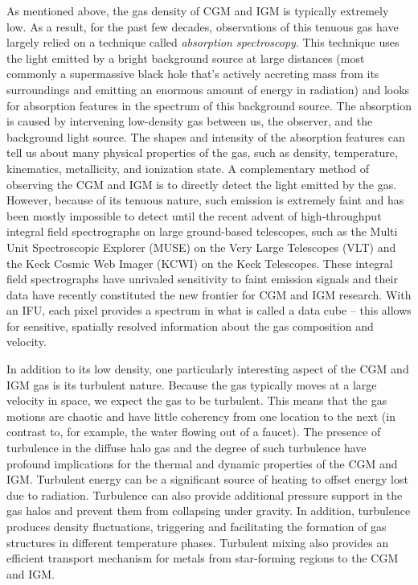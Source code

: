 As mentioned above, the gas density of CGM and IGM is typically extremely low.  As a result, for the past few decades, observations of this tenuous gas have largely relied on a technique called {\it absorption spectroscopy}. This technique uses the light emitted by a bright background source at large distances (most commonly a supermassive black hole that's actively accreting mass from its surroundings and emitting an enormous amount of energy in radiation) and looks for absorption features in the spectrum of this background source.  The absorption is caused by intervening low-density gas between us, the observer, and the background light source. The shapes and intensity of the absorption features can tell us about many physical properties of the gas, such as density, temperature, kinematics, metallicity, and ionization state. A complementary method of observing the CGM and IGM is to directly detect the light emitted by the gas. However, because of its tenuous nature, such emission is extremely faint and has been mostly impossible to detect until the recent advent of high-throughput integral field spectrographs on large ground-based telescopes, such as the Multi Unit Spectroscopic Explorer (MUSE) on the Very Large Telescopes (VLT) and the Keck Cosmic Web Imager  (KCWI) on the Keck Telescopes. These integral field spectrographs have unrivaled sensitivity to faint emission signals and their data have recently constituted the new frontier for CGM and IGM research. With an IFU, each pixel provides a spectrum in what is called a data cube -- this allows for sensitive, spatially resolved information about the gas composition and velocity.

In addition to its low density, one particularly interesting aspect of the CGM and IGM gas is its turbulent nature.  Because the gas typically moves at a large velocity in space, we expect the gas to be turbulent.  This means that the gas motions are chaotic and have little coherency from one location to the next (in contrast to, for example, the water flowing out of a faucet). The presence of turbulence in the diffuse halo gas and the degree of such turbulence have profound implications for the thermal and dynamic properties of the CGM and IGM. Turbulent energy can be a significant source of heating to offset energy lost due to radiation.  Turbulence can also provide additional pressure support in the gas halos and prevent them from collapsing under gravity. In addition, turbulence produces density fluctuations, triggering and facilitating the formation of gas structures in different temperature phases. Turbulent mixing also provides an efficient transport mechanism for metals from star-forming regions to the CGM and IGM.